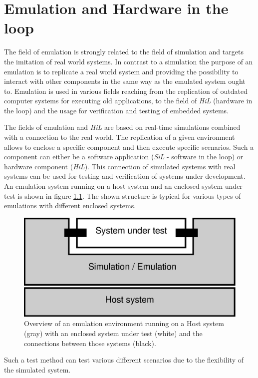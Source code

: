 \chapter{Emulation and Hardware in the loop}
\label{cha:emulation}

The field of emulation is strongly related to the field of simulation and targets the imitation of real world systems.
In contrast to a simulation the purpose of an emulation is to replicate a real world system and providing the possibility to interact with other components in the same way as the emulated system ought to.
Emulation is used in various fields reaching from the replication of outdated computer systems for executing old applications, to the field of \emph{HiL} (hardware in the loop) and the usage for verification and testing of embedded systems. \cite{emulation_koninklijke}

The fields of emulation and \emph{HiL} are based on real-time simulations combined with a connection to the real world.
The replication of a given environment allows to enclose a specific component and then execute specific scenarios.
Such a component can either be a software application (\emph{SiL} - software in the loop) or hardware component (\emph{HiL}).
This connection of simulated systems with real systems can be used for testing and verification of systems under development.
An emulation system running on a host system and an enclosed system under test is shown in figure \ref{fig:emulation_overview}.
The shown structure is typical for various types of emulations with different enclosed systems.

\begin{figure}
\centering
\includegraphics[width=0.7\linewidth]{images/emulation_overview}
\caption{Overview of an emulation environment running on a Host system (gray) with an enclosed system under test (white) and the connections between those systems (black).}
\label{fig:emulation_overview}
\end{figure}



Such a test method can test various different scenarios due to the flexibility of the simulated system.
\cite[section I]{lu_low-cost_2007}

